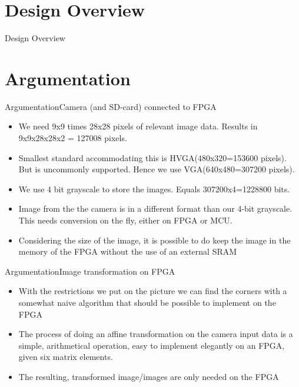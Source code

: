 \documentclass[10pt]{beamer}
\begin{document}
\section{Design Overview}
\begin{frame}{Design Overview}
\end{frame}


\section{Argumentation}
\begin{frame}{Argumentation}{Camera (and SD-card) connected to FPGA}
\begin{itemize}
\item We need 9x9 times 28x28 pixels of relevant image data. Results in 9x9x28x28x2 = 127008 pixels.
\item Smallest standard accommodating this is HVGA(480x320=153600 pixels). But is uncommonly supported. Hence we use VGA(640x480=307200 pixels).
\item We use 4 bit grayscale to store the images. Equals 307200x4=1228800 bits.
\item Image from the the camera is in a different format than our 4-bit grayscale. This needs conversion on the fly, either on FPGA or MCU.
\item Considering the size of the image, it is possible to do keep the image in the memory of the FPGA without the use of an external SRAM
\end{itemize}
\end{frame}

\begin{frame}{Argumentation}{Image transformation on FPGA}
\begin{itemize}
\item With the restrictions we put on the picture we can find the corners with a somewhat naive algorithm that should be possible to implement on the FPGA
\item The process of doing an affine transformation on the camera input data is a simple, arithmetical operation, easy to implement elegantly on an FPGA, given six matrix elements.
\item The resulting, transformed image/images are only needed on the FPGA
\end{itemize}
\end{frame}
\end{document}
